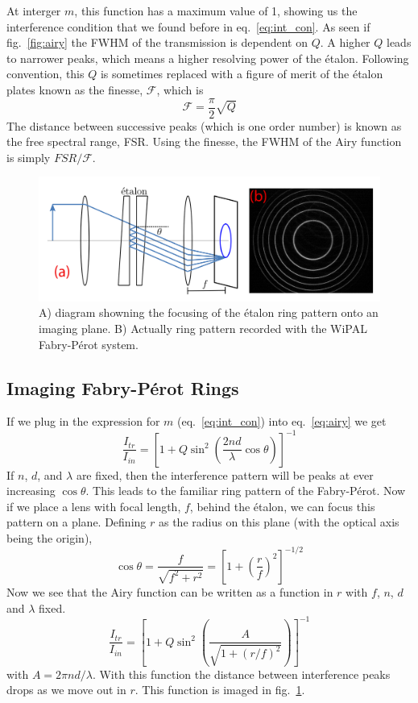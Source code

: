 \documentclass{article}
\begin{document}
At interger $m$, this function has a maximum value of 1, showing us the interference condition that we found before in eq.~\ref{eq:int_con}. As seen if fig.~\ref{fig:airy} the FWHM of the transmission is dependent on $Q$. A higher $Q$ leads to narrower peaks, which means a higher resolving power of the \'{e}talon. Following convention, this $Q$ is sometimes replaced with a figure of merit of the \'{e}talon plates known as the finesse, $\mathcal{F}$, which is 
\begin{equation}
\mathcal{F}=\frac{\pi}{2}\sqrt{Q}
\end{equation}
The distance between successive peaks (which is one order number) is known as the free spectral range, FSR. Using the finesse, the FWHM of the Airy function is simply $FSR/\mathcal{F}$. 
\begin{figure}
\begin{center}
\includegraphics[width=\textwidth]{Images/ring_pattern.png}
\caption{A) diagram showning the focusing of the \'{e}talon ring pattern onto an imaging plane. B) Actually ring pattern recorded with the WiPAL Fabry-P\'{e}rot system.
\label{fig:real_rings}}
\end{center}
\end{figure}
\subsection*{Imaging Fabry-P\'{e}rot Rings}
If we plug in the expression for $m$ (eq.~\ref{eq:int_con}) into eq.~\ref{eq:airy} we get
\begin{equation}
\frac{I_{tr}}{I_{in}}=\left[1+Q\sin^{2}{\left(\frac{2nd}{\lambda}\cos{\theta}\right)}\right]^{-1}
\end{equation}
If $n$, $d$, and $\lambda$ are fixed, then the interference pattern will be peaks at ever increasing $\cos{\theta}$. This leads to the familiar ring pattern of the Fabry-P\'{e}rot. Now if we place a lens with focal length, $f$,  behind the \'{e}talon, we can focus this pattern on a plane. Defining $r$ as the radius on this plane (with the optical axis being the origin), 
\begin{equation}
\cos{\theta}=\frac{f}{\sqrt{f^{2}+r^{2}}}=\left[1+\left(\frac{r}{f}\right)^{2}\right]^{-1/2}
\end{equation}
Now we see that the Airy function can be written as a function in $r$ with $f$, $n$, $d$ and $\lambda$ fixed. 
\begin{equation}
\frac{I_{tr}}{I_{in}}=\left[1+Q\sin^{2}{\left(\frac{A}{\sqrt{1+(r/f)^{2}}}\right)}\right]^{-1}
\end{equation}
with $A=2\pi n d / \lambda$.  With this function the distance between interference peaks drops as we move out in $r$. This function is imaged in fig.~\ref{fig:real_rings}.
\end{document}

